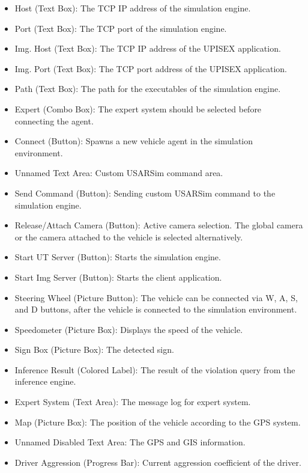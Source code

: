 \documentclass[a4paper,oneside,12pt]{report}
\begin{document}
\begin {itemize}
	\item Host (Text Box): The TCP IP address of the simulation engine.
	\item Port (Text Box): The TCP port of the simulation engine.
	\item Img. Host (Text Box): The TCP IP address of the UPISEX application.
	\item Img. Port (Text Box): The TCP port address of the UPISEX application.
	\item Path (Text Box): The path for the executables of the simulation engine.
	\item Expert (Combo Box):  The expert system should be selected before connecting the agent.
	\item Connect (Button): Spawns a new vehicle agent in the simulation environment.
	\item Unnamed Text Area: Custom USARSim command area.
	\item Send Command (Button): Sending custom USARSim command to the simulation engine.
	\item Release/Attach Camera (Button): Active camera selection. The global camera or the camera attached to the vehicle is selected alternatively.
	\item Start UT Server (Button): Starts the simulation engine.
	\item Start Img Server (Button): Starts the client application.
	\item Steering Wheel (Picture Button): The vehicle can be connected via W, A, S, and D buttons, after the vehicle is connected to the simulation environment.
	\item Speedometer (Picture Box): Displays the speed of the vehicle.
	\item Sign Box (Picture Box): The detected sign.
	\item Inference Result (Colored Label): The result of the violation query from the inference engine.
	\item Expert System (Text Area): The message log for expert system.
	\item Map (Picture Box): The position of the vehicle according to the GPS system.
	\item Unnamed Disabled Text Area: The GPS and GIS information.
	\item Driver Aggression (Progress Bar): Current aggression coefficient of the driver.
\end{itemize}	
\end{document}
